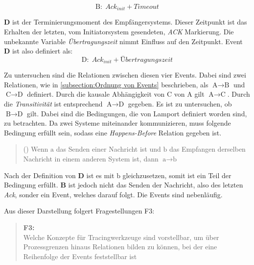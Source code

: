 \[
	\text{B}: \; Ack_{init} + Timeout  
\]

 \textbf{D} ist der Terminierungsmoment des Empfängersystems. Dieser Zeitpunkt ist das Erhalten der letzten, vom Initiatorsystem gesendeten, \emph{ACK} Markierung. Die unbekannte Variable \emph{Übertragungszeit} nimmt Einfluss auf den Zeitpunkt. Event \textbf{D} ist also definiert als:
 \[
 \text{D}: \; Ack_{init} + Übertragungszeit 
 \]
 
 Zu untersuchen sind die Relationen zwischen diesen vier Events.
 Dabei sind zwei Relationen, wie in \cref{subsection:Ordnung von Events} beschrieben, als $\text{A}\rightarrow\text{B}$ und $\text{C}\rightarrow\text{D}$ definiert. Durch die kausale Abhängigkeit von $\text{C}$ von $\text{A}$ gilt $\text{A}\rightarrow\text{C}$. Durch die \emph{Transitivität} ist entsprechend  $\text{A}\rightarrow\text{D}$ gegeben.  Es ist zu untersuchen, ob $\text{B}\rightarrow\text{D}$ gilt.
 Dabei sind die Bedingungen, die von Lamport definiert worden sind, zu betrachten. Da zwei Systeme miteinander kommunizieren, muss folgende Bedingung erfüllt sein, sodass eine \emph{Happens-Before} Relation gegeben ist. 
 \begin{quote}
	\cbstart
 	() Wenn $\text{a}$ das Senden einer Nachricht ist und $\text{b}$ das Empfangen derselben Nachricht in einem anderen System ist, dann $\text{a}\rightarrow\text{b}$
 	\cbend
 \end{quote}

Nach der Definition von \textbf{D} ist es mit $\text{b}$ gleichzusetzen, somit ist ein Teil der Bedingung erfüllt. \textbf{B} ist jedoch nicht das Senden der Nachricht, also des letzten \emph{Ack}, sonder ein Event, welches darauf folgt. Die Events sind nebenläufig. 


Aus dieser Darstellung folgert Fragestellungen F3:
\begin{quote}
	\cbstart
	\textbf{F3:} \\
	Welche Konzepte für Tracingwerkzeuge sind vorstellbar, um über Prozessgrenzen hinaus Relationen bilden zu können, bei der eine Reihenfolge der Events feststellbar ist
	\cbend
\end{quote}

